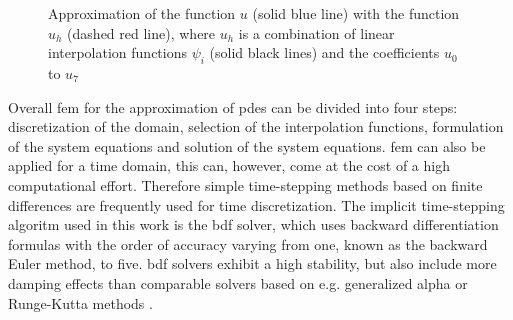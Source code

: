 \begin{figure}[H]
\centering
{}
\caption[Approximation of a function with FEM]{Approximation of the function $u$ (solid blue line) with the function $u_{h}$ (dashed red line), where $u_{h}$ is a combination of linear interpolation functions $\psi_{i}$ (solid black lines) and the coefficients $u_{0}$ to $u_{7}$ \cite{ComsolFEM}
\label{fig:FEM}
}
\end{figure}

Overall \gls{fem} for the approximation of \glspl{pde} can be divided into four steps: discretization of the domain, selection of the interpolation functions, formulation of the system equations and solution of the system equations. \newline 
\Gls{fem} can also be applied for a time domain, this can, however, come at the cost of a high computational effort. Therefore simple time-stepping methods based on finite differences are frequently used for time discretization. The implicit time-stepping algoritm used in this work is the \gls{bdf} solver, which uses backward differentiation formulas with the order of accuracy varying from one, known as the backward Euler method, to five. \gls{bdf} solvers exhibit a high stability, but also include more damping effects than comparable solvers based on e.g. generalized alpha or Runge-Kutta methods \cite{ComsolRefManual}.  

